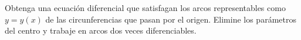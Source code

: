 Obtenga una ecuación diferencial que satisfagan los arcos representables como $y=y(x)$ de las circunferencias que pasan por el origen. Elimine los parámetros del centro y trabaje en arcos dos veces diferenciables.
